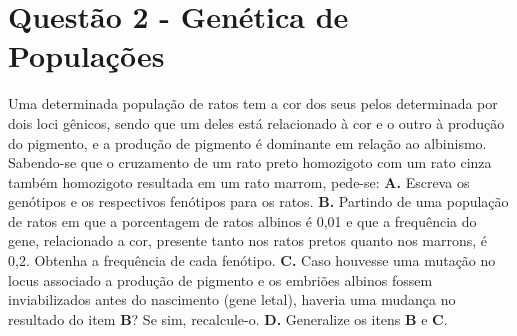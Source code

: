 \documentclass[a4paper, 12pt]{article}
\begin{document}
\section*{Questão 2 - Genética de Populações}
\large {Uma determinada população de ratos tem a cor dos seus pelos determinada por dois loci gênicos, sendo que um deles está relacionado à cor e o outro à produção do pigmento, e a produção de pigmento é dominante em relação ao albinismo. Sabendo-se que o cruzamento de um rato preto homozigoto com um rato cinza também homozigoto resultada em um rato marrom, pede-se:}
\newline
\newline
\textbf{A.}  Escreva os genótipos e os respectivos fenótipos para os ratos.
\newline
\newline
\textbf{B.} Partindo de uma população de ratos em que a porcentagem de ratos albinos é 0,01 e que a frequência do gene, relacionado a cor, presente tanto nos ratos pretos quanto nos marrons, é 0,2. Obtenha a frequência de cada fenótipo.
\newline
\newline
\textbf{C.}  Caso houvesse uma mutação no locus associado a produção de pigmento e os embriões albinos fossem inviabilizados antes do nascimento (gene letal), haveria uma mudança no resultado do item \textbf{B}? Se sim, recalcule-o.
\newline
\newline
\textbf{D.} Generalize os itens \textbf{B} e \textbf{C}.
\end{document}

